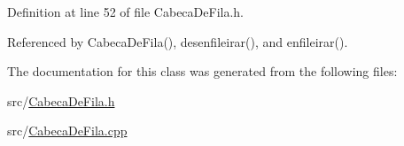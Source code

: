 Definition at line 52 of file CabecaDeFila.h.



Referenced by CabecaDeFila(), desenfileirar(), and enfileirar().



The documentation for this class was generated from the following files:\begin{DoxyCompactItemize}
\item 
src/\hyperlink{CabecaDeFila_8h}{CabecaDeFila.h}\item 
src/\hyperlink{CabecaDeFila_8cpp}{CabecaDeFila.cpp}\end{DoxyCompactItemize}
